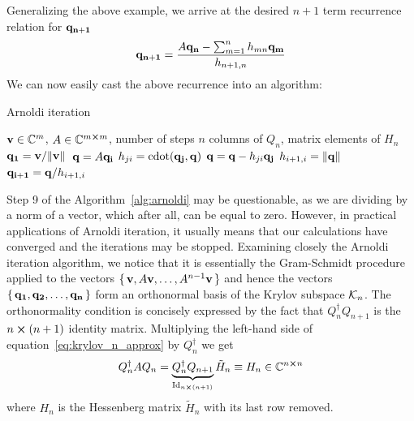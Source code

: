 Generalizing the above example, we arrive at the desired \(n+1\) term recurrence relation for \(\vectorbold{q_{n+1}}\)
\begin{equation}
	\vectorbold{q_{n+1}} = \frac{A \vectorbold{q_n} - \sum_{m=1}^{n} h_{mn}\vectorbold{q_m}}{h_{n+1,n}}
	\label{eq:arnoldi_recurrence}
\end{equation}
We can now easily cast the above recurrence into an algorithm:
\begin{algorithm}[H]
	\algrenewcommand{}
	\algrenewcommand{}
	\caption{Arnoldi iteration}
	\label{alg:arnoldi}
	\begin{algorithmic}[1]
		\Require \(\vectorbold{v} \in \CC^m\), \(A \in \mathbb{C}^{m\cross m}\), number of steps \(n\)
		\Ensure columns of \(Q_n\), matrix elements of \(H_n\)
		\State \(\vectorbold{q_1} = \vectorbold{v}/\norm*{\vectorbold{v}}\) 
		\State \(\vectorbold{q} = A\vectorbold{q_i}\)
		\State \(h_{ji} = \mathrm{cdot}(\vectorbold{q_j},\vectorbold{q})\) 
		\State \(\vectorbold{q} = \vectorbold{q} - h_{ji}\vectorbold{q_j}\) 
		\EndFor
		\State \(h_{i+1,i} = \norm{\vectorbold{q}} \)
		\State \(\vectorbold{q_{i+1}} = \vectorbold{q}/h_{i+1,i} \)
		\EndFor
	\end{algorithmic}
\end{algorithm}
\noindent Step 9 of the Algorithm~\ref{alg:arnoldi} may be questionable, as we are dividing by a norm of a vector, which
after all, can be equal to zero. However, in practical applications of Arnoldi iteration, it usually means
that our calculations have converged and the iterations may be stopped.
Examining closely the Arnoldi iteration algorithm, we notice that it is essentially the Gram-Schmidt
procedure applied to the vectors \(\{\,\vectorbold{v}, A\vectorbold{v},\ldots, A^{n-1}\vectorbold{v}\,\}\) and hence the
vectors \(\{\,\vectorbold{q_1}, \vectorbold{q_2},\ldots,\vectorbold{q_n}\,\}\) form an orthonormal basis
of the Krylov subspace \(\mathcal{K}_{n}\). The orthonormality condition is concisely expressed by
the fact that \(Q^{\dagger}_n Q_{n+1} \) is the \(n\cross (n+1)\) identity matrix. Multiplying the left-hand side of
equation~\eqref{eq:krylov_n_approx} by \(Q^{\dagger}_n\) we get
\begin{equation}
	Q^{\dagger}_n A Q_n = \underbrace{Q^{\dagger}_n Q_{n+1}}_{\mathrm{Id}_{n\cross(n+1)}}\tilde{H}_n \equiv  H_n \in \mathbb{C}^{n\cross n}
	\label{eq:hessenberg}
\end{equation}
where \(H_n\) is the Hessenberg matrix \(\tilde{H}_n\) with its last row removed.


